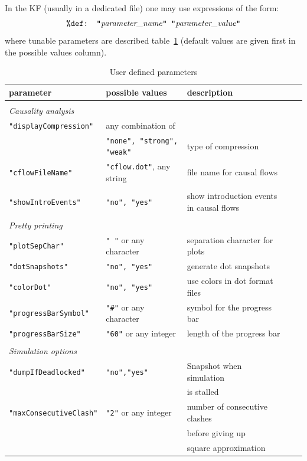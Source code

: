 \documentclass[11pt]{book}
\def\ttt#1{\texttt{#1}}
\begin{document}
In the KF (usually in a dedicated file) one may use expressions of the form:
\[
\hbox{\ttt{\%def: "}\textit{parameter\_name}\ttt{" "}\textit{parameter\_value}\ttt{"}}
\]
where tunable parameters are described table~\ref{tab:parameters} (default values are given first in the possible values column).
\begin{table}[ht]
\caption{User defined parameters}
\begin{tabular}{l|l|lll}
parameter & possible values & description \\
\hline &\\
\textit{Causality analysis}&\\
\ttt{"displayCompression"} & any combination of \\
&  \ttt{"none", "strong", "weak"} & \small type of compression \\
\ttt{"cflowFileName"} & \ttt{"cflow.dot"}, any string & \small file name for causal flows\\ & \\
\ttt{"showIntroEvents"} & \ttt{"no", "yes"} & \small show introduction events in causal flows\\ & \\
\textit{Pretty printing}&\\
\ttt{"plotSepChar"} & \ttt{" "} or any character & \small separation character for plots\\
\ttt{"dotSnapshots"} & \ttt{"no", "yes"} & \small generate dot snapshots\\
\ttt{"colorDot"} &  \ttt{"no", "yes"} & \small use colors in dot format files\\
\ttt{"progressBarSymbol"} & \ttt{"\#"} or any character & \small symbol for the progress bar\\
\ttt{"progressBarSize"} & \ttt{"60"} or any integer & \small length of the progress bar\\ &&\\
\textit{Simulation options} &\\
\ttt{"dumpIfDeadlocked"} & \ttt{"no","yes"} & \small Snapshot when simulation \\&&\small is stalled\\
\ttt{"maxConsecutiveClash"} & \ttt{"2"} or any integer & \small number of consecutive clashes \\ && \small before giving up \\ && \small square approximation\\
\end{tabular}
\label{tab:parameters}
\end{table}
\end{document}
